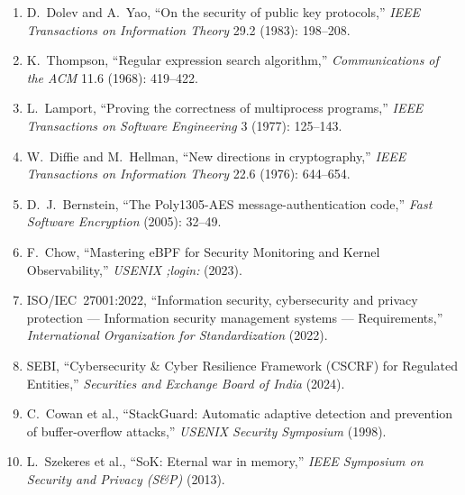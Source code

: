 \documentclass{portalciencia}
\theoremstyle{plain}
\theoremstyle{definition}
\begin{document}
\begin{enumerate}
  \item D.~Dolev and A.~Yao, ``On the security of public key protocols,'' \emph{IEEE Transactions on Information Theory} 29.2 (1983): 198--208.

  \item K.~Thompson, ``Regular expression search algorithm,'' \emph{Communications of the ACM} 11.6 (1968): 419--422.

  \item L.~Lamport, ``Proving the correctness of multiprocess programs,'' \emph{IEEE Transactions on Software Engineering} 3 (1977): 125--143.

  \item W.~Diffie and M.~Hellman, ``New directions in cryptography,'' \emph{IEEE Transactions on Information Theory} 22.6 (1976): 644--654.

  \item D.~J.~Bernstein, ``The Poly1305-AES message-authentication code,'' \emph{Fast Software Encryption} (2005): 32--49.

  \item F.~Chow, ``Mastering eBPF for Security Monitoring and Kernel Observability,'' \emph{USENIX ;login:} (2023).

  \item ISO/IEC~27001:2022, ``Information security, cybersecurity and privacy protection --- Information security management systems --- Requirements,'' \emph{International Organization for Standardization} (2022).

  \item SEBI, ``Cybersecurity \& Cyber Resilience Framework (CSCRF) for Regulated Entities,'' \emph{Securities and Exchange Board of India} (2024).

  \item C.~Cowan et al., ``StackGuard: Automatic adaptive detection and prevention of buffer-overflow attacks,'' \emph{USENIX Security Symposium} (1998).

  \item L.~Szekeres et al., ``SoK: Eternal war in memory,'' \emph{IEEE Symposium on Security and Privacy (S\&P)} (2013).
\end{enumerate}
\end{document}

